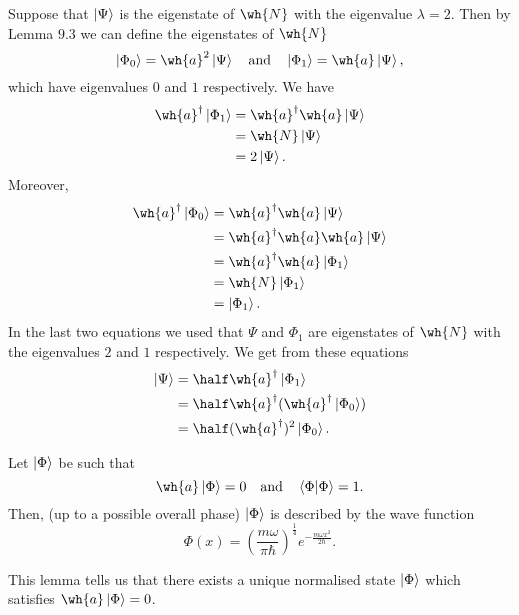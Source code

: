 \documentclass[12pt, a4paper]{article}
\begin{document}
\begin{mdexample}
    Suppose that \(\ket{\Psi}\) is the eigenstate of \(\wh{N}\) with the eigenvalue \(\lambda =2\). Then by Lemma \(9.3\) we can define the eigenstates of \(\wh{N}\)
    \[\ket{\Phi_0} = \wh{a}^2 \ket{\Psi} \quad \text{and} \quad \ket{\Phi_1}=\wh{a}\ket{\Psi},\]
    which have eigenvalues \(0\) and \(1\) respectively. We have 
    \[\begin{aligned}
        \wh{a}^{\dagger} \ket{\Phi_1} &= \wh{a}^{\dagger}\wh{a}\ket{\Psi} \\
        &= \wh{N}\ket{\Psi} \\
        &= 2\ket{\Psi}.
    \end{aligned}\]
    Moreover,
    \[\begin{aligned}
        \wh{a}^{\dagger} \ket{\Phi_0} &= \wh{a}^{\dagger} \wh{a}\ket{\Psi} \\
        &= \wh{a}^{\dagger}\wh{a}\wh{a}\ket{\Psi} \\
        &= \wh{a}^{\dagger}\wh{a}\ket{\Phi_1} \\
        &= \wh{N} \ket{\Phi_1} \\
        &= \ket{\Phi_1}.
    \end{aligned}\]
    In the last two equations we used that \(\Psi\) and \(\Phi_1\) are eigenstates of \(\wh{N}\) with the eigenvalues \(2\) and \(1\) respectively. We get from these equations 
    \[\begin{aligned}
        \ket{\Psi} &= \half \wh{a}^{\dagger} \ket{\Phi_1} \\
        &= \half \wh{a}^{\dagger} (\wh{a}^{\dagger}\ket{\Phi_0}) \\
        &= \half (\wh{a}^{\dagger})^2 \ket{\Phi_0}.
    \end{aligned}\]
\end{mdexample}

\begin{mdlemma}
    Let \(\ket{\Phi}\) be such that 
    \[\wh{a}\ket{\Phi}=0 \quad \text{and} \quad \bra{\Phi}\ket{\Phi}=1.\]
    Then, (up to a possible overall phase) \(\ket{\Phi}\) is described by the wave function 
    \[\Phi(x)=\left( \frac{m\omega}{\pi \hbar} \right)^{\frac{1}{4}} e^{-\frac{m\omega x^2}{2\hbar}}.\]
\end{mdlemma}

\begin{mdnote}
    This lemma tells us that there exists a unique normalised state \(\ket{\Phi}\) which satisfies \(\wh{a} \ket{\Phi}=0\).
\end{mdnote}
\end{document}
